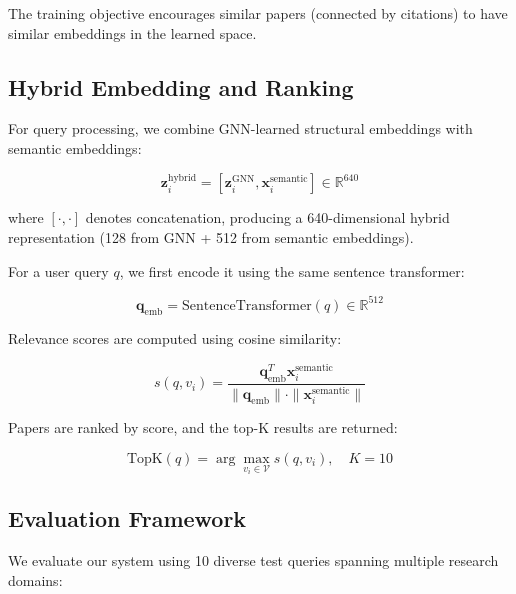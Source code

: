 \documentclass[pdflatex,sn-mathphys-num]{sn-jnl}
\theoremstyle{thmstyleone}%
\theoremstyle{thmstyletwo}%
\theoremstyle{thmstylethree}%
\begin{document}
The training objective encourages similar papers (connected by citations) to have similar embeddings in the learned space.

\subsection{Hybrid Embedding and Ranking}

For query processing, we combine GNN-learned structural embeddings with semantic embeddings:

\begin{equation}
    \mathbf{z}_i^{\text{hybrid}} = [\mathbf{z}_i^{\text{GNN}}, \mathbf{x}_i^{\text{semantic}}] \in \mathbb{R}^{640}
\end{equation}

where $[·,·]$ denotes concatenation, producing a 640-dimensional hybrid representation (128 from GNN + 512 from semantic embeddings).

For a user query $q$, we first encode it using the same sentence transformer:

\begin{equation}
    \mathbf{q}_{\text{emb}} = \text{SentenceTransformer}(q) \in \mathbb{R}^{512}
\end{equation}

Relevance scores are computed using cosine similarity:

\begin{equation}
    s(q, v_i) = \frac{\mathbf{q}_{\text{emb}}^T \mathbf{x}_i^{\text{semantic}}}{\|\mathbf{q}_{\text{emb}}\| \cdot \|\mathbf{x}_i^{\text{semantic}}\|}
\end{equation}

Papers are ranked by score, and the top-K results are returned:

\begin{equation}
    \text{TopK}(q) = \arg\max_{v_i \in \mathcal{V}} s(q, v_i), \quad K = 10
\end{equation}

\subsection{Evaluation Framework}

We evaluate our system using 10 diverse test queries spanning multiple research domains:
\end{document}
